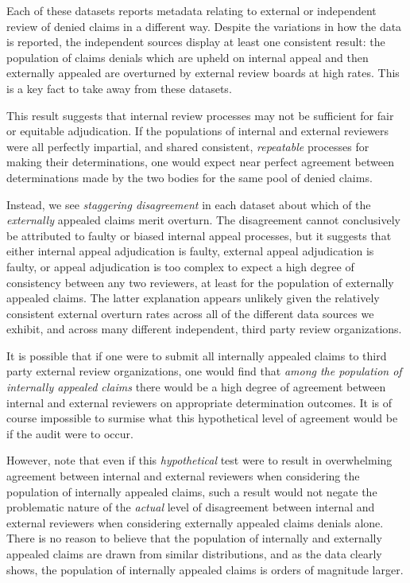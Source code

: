 \documentclass[12pt, a4paper,twoside,parskip=full]{report}
\theoremstyle{plain} %
\theoremstyle{definition} %
\theoremstyle{remark} %
\numberwithin{equation}{chapter}
\begin{document}
		Each of these datasets reports metadata relating to external or independent review of denied claims in a different way. Despite the variations in how the data is reported, the independent sources display at least one consistent result: the population of claims denials which are upheld on internal appeal and then externally appealed are overturned by external review boards at high rates. This is a key fact to take away from these datasets.
		
		
		This result suggests that internal review processes may not be sufficient for fair or equitable adjudication. If the populations of internal and external reviewers were all perfectly impartial, and shared consistent, \emph{repeatable} processes for making their determinations, one would expect near perfect agreement between determinations made by the two bodies for the same pool of denied claims.
		
		Instead, we see \emph{staggering disagreement} in each dataset about which of the \emph{externally} appealed claims merit overturn. The disagreement cannot conclusively be attributed to faulty or biased internal appeal processes, but it suggests that either internal appeal adjudication is faulty, external appeal adjudication is faulty, or appeal adjudication is too complex to expect a high degree of consistency between any two reviewers, at least for the population of externally appealed claims. The latter explanation appears unlikely given the relatively consistent external overturn rates across all of the different data sources we exhibit, and across many different independent, third party review organizations.
		
		It is possible that if one were to submit all internally appealed claims to third party external review organizations, one would find that \emph{among the population of internally appealed claims} there would be a high degree of agreement between internal and external reviewers on appropriate determination outcomes. It is of course impossible to surmise what this hypothetical level of agreement would be if the audit were to occur.
		
		However, note that even if this \emph{hypothetical} test were to result in overwhelming agreement between internal and external reviewers when considering the population of internally appealed claims, such a result would not negate the problematic nature of the \emph{actual} level of disagreement between internal and external reviewers when considering externally appealed claims denials alone. There is no reason to believe that the population of internally and externally appealed claims are drawn from similar distributions, and as the data clearly shows, the population of internally appealed claims is orders of magnitude larger.
		
\end{document}
